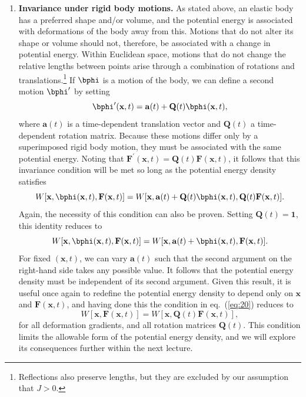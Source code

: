 \begin{enumerate}
    \item[(ii)] \textbf{Invariance under rigid body motions.} As stated above, an elastic body has a preferred shape and/or volume, 
    and the potential energy is associated with deformations of the body away from this. Motions that do not alter its shape or 
    volume should not, therefore, be associated with a change in potential energy. Within Euclidean space, motions that do 
    not change the relative lengths between points arise through a combination of rotations and translations.\footnote{Reflections also preserve lengths, but they are excluded by our assumption that $J>0$.} If $\bphi$ 
    is a motion of the body, we can define a second motion $\bphi^{\prime}$ by setting
    \begin{equation}
    \bphi^{\prime}(\mathbf{x},t)=\mathbf{a}(t)+\mathbf{Q}(t)\bphi(\mathbf{x},t),
    \label{eq:19}
    \end{equation}
    where $\mathbf{a}(t)$ is a time-dependent translation vector and $\mathbf{Q}(t)$ a time-dependent rotation matrix. Because these motions differ only by a superimposed rigid body motion, they 
    must be associated with the same potential energy. Noting that $\mathbf{F}^{\prime}(\mathbf{x},t)=\mathbf{Q}(t)\mathbf{F}(\mathbf{x},t)$, 
    it follows that this invariance condition will be met so long as the potential energy density satisfies
    \begin{equation}
    W[\mathbf{x},\bphi(\mathbf{x},t),\mathbf{F}(\mathbf{x},t)]=W[\mathbf{x},\mathbf{a}(t)
    +\mathbf{Q}(t)\bphi(\mathbf{x},t),\mathbf{Q}(t)\mathbf{F}(\mathbf{x},t)].
    \label{eq:20}
    \end{equation}
    Again, the necessity of this condition can also be proven. Setting $\mathbf{Q}(t)=\mathbf{1}$, this identity reduces to
    \begin{equation}
    W[\mathbf{x},\bphi(\mathbf{x},t),\mathbf{F}(\mathbf{x},t)]=W[\mathbf{x},\mathbf{a}(t)+\bphi(\mathbf{x},t),\mathbf{F}(\mathbf{x},t)].
    \label{eq:21}
    \end{equation}
    For fixed $(\mathbf{x}, t)$, we can vary $\mathbf{a}(t)$ such that the second argument on the right-hand side takes any possible value.
     It follows that the potential energy density must be independent of its second argument. Given this result, it is useful once again 
     to redefine the potential energy density to depend only on $\mathbf{x}$ and $\mathbf{F}(\mathbf{x},t)$, and having done this 
     the condition in eq.~(\ref{eq:20}) reduces to
    \begin{equation}
    W[\mathbf{x},\mathbf{F}(\mathbf{x},t)]=W[\mathbf{x},\mathbf{Q}(t)\mathbf{F}(\mathbf{x},t)],
    \label{eq:22}
    \end{equation}
    for all deformation gradients, and all rotation matrices $\mathbf{Q}(t)$. This condition limits the allowable form of the potential
    energy density, and we will explore its consequences further within the next lecture.
\end{enumerate}
